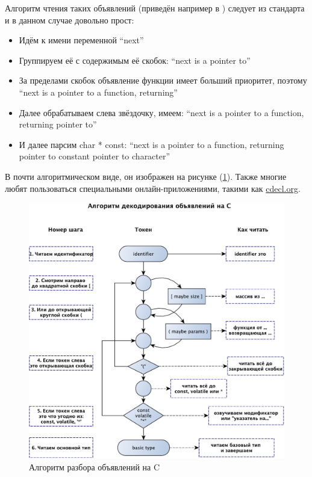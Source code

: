 \documentclass[a4paper,12pt,oneside]{article}
\newif\ifanswers
\begin{document}
\ifanswers
Правильный ответ: указатель на функцию, возвращающую указатель на константный указатель на символ.
\fi

Алгоритм чтения таких объявлений (приведён например в \cite{linden}) следует из стандарта и в данном случае довольно прост:

\begin{itemize}
\item
Идём к имени переменной ``next''
\item
Группируем её с содержимым её скобок: ``next is a pointer to''
\item
За пределами скобок объявление функции имеет больший приоритет, поэтому ``next is a pointer to a function, returning''
\item
Далее обрабатываем слева звёздочку, имеем: ``next is a pointer to a function, returning pointer to''
\item
И далее парсим char * const: ``next is a pointer to a function, returning pointer to constant pointer to character''
\end{itemize}

В почти алгоритмическом виде, он изображен на рисунке (\ref{fig:cdecl_parse}). Также многие любят пользоваться специальными онлайн-приложениями, такими как \url{cdecl.org}.

\begin{figure}[h!]
\centering
\includegraphics[width=1.0\textwidth]{illustrations/cdecls-crop.pdf}
\caption{Алгоритм разбора объявлений на C}
\label{fig:cdecl_parse}
\end{figure}
\end{document}
